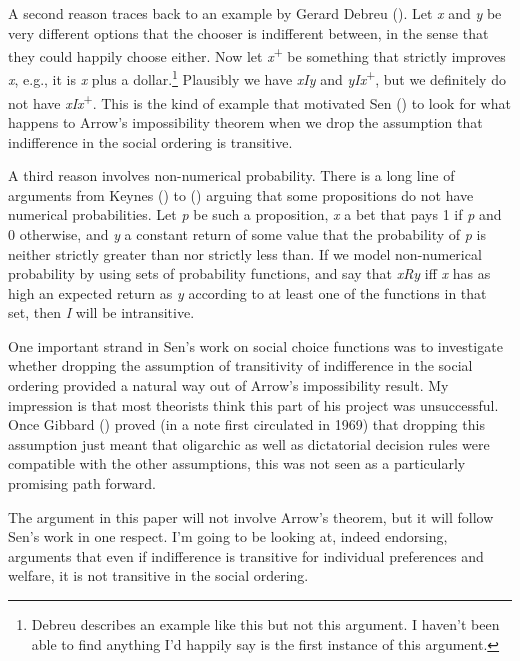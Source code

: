 \documentclass[
  11pt,
  letterpaper,
  DIV=11,
  numbers=noendperiod,
  twoside]{scrartcl}
\begin{document}
A second reason traces back to an example by Gerard Debreu
(). Let \emph{x} and \emph{y} be very
different options that the chooser is indifferent between, in the sense
that they could happily choose either. Now let
\emph{x}\textsuperscript{+} be something that strictly improves
\emph{x}, e.g., it is \emph{x} plus a dollar.\footnote{Debreu describes
  an example like this but not this argument. I haven't been able to
  find anything I'd happily say is the first instance of this argument.}
Plausibly we have \emph{xIy} and \emph{yIx}\textsuperscript{+}, but we
definitely do not have \emph{xIx}\textsuperscript{+}. This is the kind
of example that motivated Sen () to look for what happens to Arrow's impossibility theorem when we
drop the assumption that indifference in the social ordering is
transitive.

A third reason involves non-numerical probability. There is a long line
of arguments from Keynes () to
() arguing
that some propositions do not have numerical probabilities. Let \emph{p}
be such a proposition, \emph{x} a bet that pays 1 if \emph{p} and 0
otherwise, and \emph{y} a constant return of some value that the
probability of \emph{p} is neither strictly greater than nor strictly
less than. If we model non-numerical probability by using sets of
probability functions, and say that \emph{xRy} iff \emph{x} has as high
an expected return as \emph{y} according to at least one of the
functions in that set, then \emph{I} will be intransitive.

One important strand in Sen's work on social choice functions was to
investigate whether dropping the assumption of transitivity of
indifference in the social ordering provided a natural way out of
Arrow's impossibility result. My impression is that most theorists think
this part of his project was unsuccessful. Once Gibbard
() proved (in a note first circulated in
1969) that dropping this assumption just meant that oligarchic as well
as dictatorial decision rules were compatible with the other
assumptions, this was not seen as a particularly promising path forward.

The argument in this paper will not involve Arrow's theorem, but it will
follow Sen's work in one respect. I'm going to be looking at, indeed
endorsing, arguments that even if indifference is transitive for
individual preferences and welfare, it is not transitive in the social
ordering.
\end{document}
